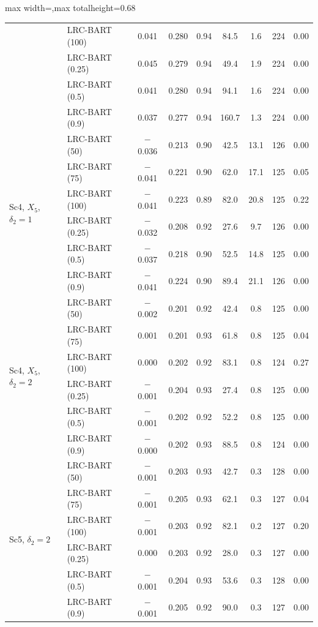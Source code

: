 \documentclass[11pt]{article}
\theoremstyle{definition}
\theoremstyle{plain}
\begin{document}
\begin{table}[htbp]
\begin{adjustbox}{max width=\textwidth,max totalheight=0.68\textheight}
\begin{tabular}{llccccccc}
& LRC-BART (100) & 0.041 & 0.280 & 0.94 & 84.5 & 1.6 & 224 & 0.00 \\
& LRC-BART (0.25) & 0.045 & 0.279 & 0.94 & 49.4 & 1.9 & 224 & 0.00 \\
& LRC-BART (0.5) & 0.041 & 0.280 & 0.94 & 94.1 & 1.6 & 224 & 0.00 \\
& LRC-BART (0.9) & 0.037 & 0.277 & 0.94 & 160.7 & 1.3 & 224 & 0.00 \\
\midrule
\multirow{6}{*}{Sc4, $X_5$, $\delta_2=1$} & LRC-BART (50) & $-$0.036 & 0.213 & 0.90 & 42.5 & 13.1 & 126 & 0.00 \\
& LRC-BART (75) & $-$0.041 & 0.221 & 0.90 & 62.0 & 17.1 & 125 & 0.05 \\
& LRC-BART (100) & $-$0.041 & 0.223 & 0.89 & 82.0 & 20.8 & 125 & 0.22 \\
& LRC-BART (0.25) & $-$0.032 & 0.208 & 0.92 & 27.6 & 9.7 & 126 & 0.00 \\
& LRC-BART (0.5) & $-$0.037 & 0.218 & 0.90 & 52.5 & 14.8 & 125 & 0.00 \\
& LRC-BART (0.9) & $-$0.041 & 0.224 & 0.90 & 89.4 & 21.1 & 126 & 0.00 \\
\midrule
\multirow{6}{*}{Sc4, $X_5$, $\delta_2=2$} & LRC-BART (50) & $-$0.002 & 0.201 & 0.92 & 42.4 & 0.8 & 125 & 0.00 \\
& LRC-BART (75) & 0.001 & 0.201 & 0.93 & 61.8 & 0.8 & 125 & 0.04 \\
& LRC-BART (100) & 0.000 & 0.202 & 0.92 & 83.1 & 0.8 & 124 & 0.27 \\
& LRC-BART (0.25) & $-$0.001 & 0.204 & 0.93 & 27.4 & 0.8 & 125 & 0.00 \\
& LRC-BART (0.5) & $-$0.001 & 0.202 & 0.92 & 52.2 & 0.8 & 125 & 0.00 \\
& LRC-BART (0.9) & $-$0.000 & 0.202 & 0.93 & 88.5 & 0.8 & 124 & 0.00 \\
\midrule
\multirow{6}{*}{Sc5, $\delta_2=2$} & LRC-BART (50) & $-$0.001 & 0.203 & 0.93 & 42.7 & 0.3 & 128 & 0.00 \\
& LRC-BART (75) & $-$0.001 & 0.205 & 0.93 & 62.1 & 0.3 & 127 & 0.04 \\
& LRC-BART (100) & $-$0.001 & 0.203 & 0.92 & 82.1 & 0.2 & 127 & 0.20 \\
& LRC-BART (0.25) & 0.000 & 0.203 & 0.92 & 28.0 & 0.3 & 127 & 0.00 \\
& LRC-BART (0.5) & $-$0.001 & 0.204 & 0.93 & 53.6 & 0.3 & 128 & 0.00 \\
& LRC-BART (0.9) & $-$0.001 & 0.205 & 0.92 & 90.0 & 0.3 & 127 & 0.00 \\
\bottomrule
\end{tabular}
\end{adjustbox}
\end{table}
\end{document}
